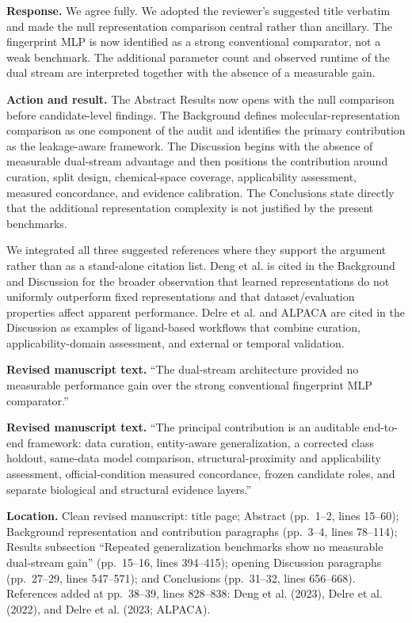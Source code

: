 \documentclass[10pt]{article}
\newcommand{\Response}{\textbf{Response.} }
\newcommand{\Action}{\textbf{Action and result.} }
\newcommand{\RevisedText}{\textbf{Revised manuscript text.} }
\newcommand{\Location}{\textbf{Location.} }
\newcommand{\qtext}[1]{``#1''}
\begin{document}
\Response We agree fully. We adopted the reviewer's suggested title verbatim and made the null representation comparison central rather than ancillary. The fingerprint MLP is now identified as a strong conventional comparator, not a weak benchmark. The additional parameter count and observed runtime of the dual stream are interpreted together with the absence of a measurable gain.

\Action The Abstract Results now opens with the null comparison before candidate-level findings. The Background defines molecular-representation comparison as one component of the audit and identifies the primary contribution as the leakage-aware framework. The Discussion begins with the absence of measurable dual-stream advantage and then positions the contribution around curation, split design, chemical-space coverage, applicability assessment, measured concordance, and evidence calibration. The Conclusions state directly that the additional representation complexity is not justified by the present benchmarks.

We integrated all three suggested references where they support the argument rather than as a stand-alone citation list. Deng et al. is cited in the Background and Discussion for the broader observation that learned representations do not uniformly outperform fixed representations and that dataset/evaluation properties affect apparent performance. Delre et al. and ALPACA are cited in the Discussion as examples of ligand-based workflows that combine curation, applicability-domain assessment, and external or temporal validation.

\RevisedText \qtext{The dual-stream architecture provided no measurable performance gain over the strong conventional fingerprint MLP comparator.}

\RevisedText \qtext{The principal contribution is an auditable end-to-end framework: data curation, entity-aware generalization, a corrected class holdout, same-data model comparison, structural-proximity and applicability assessment, official-condition measured concordance, frozen candidate roles, and separate biological and structural evidence layers.}

\Location Clean revised manuscript: title page; Abstract (pp.~1--2, lines 15--60); Background representation and contribution paragraphs (pp.~3--4, lines 78--114); Results subsection ``Repeated generalization benchmarks show no measurable dual-stream gain'' (pp.~15--16, lines 394--415); opening Discussion paragraphs (pp.~27--29, lines 547--571); and Conclusions (pp.~31--32, lines 656--668). References added at pp.~38--39, lines 828--838: Deng et al. (2023), Delre et al. (2022), and Delre et al. (2023; ALPACA).
\end{document}
